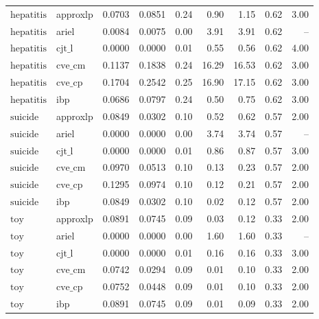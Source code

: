 \documentclass{article}
\begin{document}
\begin{table}[ht]
\begin{tabular}{llrrrrrrr}
\hline
$\text{hepatitis}$ & approxlp & 0.0703 & 0.0851 & 0.24 & 0.90 & 1.15 & 0.62 & 3.00 \\
$\text{hepatitis}$ & ariel & 0.0084 & 0.0075 & 0.00 & 3.91 & 3.91 & 0.62 & -- \\
$\text{hepatitis}$ & $\text{cjt\_l}$ & 0.0000 & 0.0000 & 0.01 & 0.55 & 0.56 & 0.62 & 4.00 \\
$\text{hepatitis}$ & $\text{cve\_cm}$ & 0.1137 & 0.1838 & 0.24 & 16.29 & 16.53 & 0.62 & 3.00 \\
$\text{hepatitis}$ & $\text{cve\_cp}$ & 0.1704 & 0.2542 & 0.25 & 16.90 & 17.15 & 0.62 & 3.00 \\
$\text{hepatitis}$ & ibp & 0.0686 & 0.0797 & 0.24 & 0.50 & 0.75 & 0.62 & 3.00 \\
\hline
$\text{suicide}$ & approxlp & 0.0849 & 0.0302 & 0.10 & 0.52 & 0.62 & 0.57 & 2.00 \\
$\text{suicide}$ & ariel & 0.0000 & 0.0000 & 0.00 & 3.74 & 3.74 & 0.57 & -- \\
$\text{suicide}$ & $\text{cjt\_l}$ & 0.0000 & 0.0000 & 0.01 & 0.86 & 0.87 & 0.57 & 3.00 \\
$\text{suicide}$ & $\text{cve\_cm}$ & 0.0970 & 0.0513 & 0.10 & 0.13 & 0.23 & 0.57 & 2.00 \\
$\text{suicide}$ & $\text{cve\_cp}$ & 0.1295 & 0.0974 & 0.10 & 0.12 & 0.21 & 0.57 & 2.00 \\
$\text{suicide}$ & ibp & 0.0849 & 0.0302 & 0.10 & 0.02 & 0.12 & 0.57 & 2.00 \\
\hline
$\text{toy}$ & approxlp & 0.0891 & 0.0745 & 0.09 & 0.03 & 0.12 & 0.33 & 2.00 \\
$\text{toy}$ & ariel & 0.0000 & 0.0000 & 0.00 & 1.60 & 1.60 & 0.33 & -- \\
$\text{toy}$ & $\text{cjt\_l}$ & 0.0000 & 0.0000 & 0.01 & 0.16 & 0.16 & 0.33 & 3.00 \\
$\text{toy}$ & $\text{cve\_cm}$ & 0.0742 & 0.0294 & 0.09 & 0.01 & 0.10 & 0.33 & 2.00 \\
$\text{toy}$ & $\text{cve\_cp}$ & 0.0752 & 0.0448 & 0.09 & 0.01 & 0.10 & 0.33 & 2.00 \\
$\text{toy}$ & ibp & 0.0891 & 0.0745 & 0.09 & 0.01 & 0.09 & 0.33 & 2.00 \\
\bottomrule
\end{tabular}
\end{table}
\end{document}
